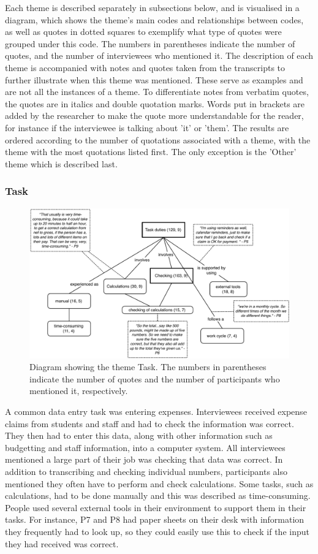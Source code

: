Each theme is described separately in subsections below, and is visualised in a diagram, which shows the theme's main codes and relationships between codes, as well as quotes in dotted squares to exemplify what type of quotes were grouped under this code. The numbers in parentheses indicate the number of quotes, and the number of interviewees who mentioned it. 
The description of each theme is accompanied with notes and quotes taken from the transcripts to further illustrate when this theme was mentioned. These serve as examples and are not all the instances of a theme. To differentiate notes from verbatim quotes, the quotes are in italics and double quotation marks. Words put in brackets are added by the researcher to make the quote more understandable for the reader, for instance if the interviewee is talking about 'it' or 'them'.
The results are ordered according to the number of quotations associated with a theme, with the theme with the most quotations listed first. The only exception is the 'Other' theme which is described last.
\newpage
\subsubsection{Task}
\begin{figure}[!ht]
\centering
\includegraphics[width=\textwidth]{images/ch12/Task.pdf}
\caption[Study 1 Task diagram]{Diagram showing the theme Task. The numbers in parentheses indicate the number of quotes and the number of participants who mentioned it, respectively.}
\vspace{-9pt}
\label{fig:ch3_task}
\end{figure}
A common data entry task was entering expenses. Interviewees received expense claims from students and staff and had to check the information was correct. They then had to enter this data, along with other information such as budgetting and staff information, into a computer system.
All interviewees mentioned a large part of their job was checking that data was correct. In addition to transcribing and checking individual numbers, participants also mentioned they often have to perform and check calculations.
 Some tasks, such as calculations, had to be done manually and this was described as time-consuming. People used several external tools in their environment to support them in their tasks. For instance, P7 and P8 had paper sheets on their desk with information they frequently had to look up, so they could easily use this to check if the input they had received was correct.

